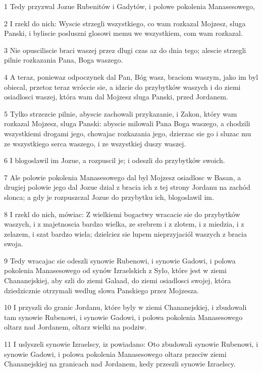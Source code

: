 \par 1 Tedy przyzwal Jozue Rubenitów i Gadytów, i polowe pokolenia Manasesowego,
\par 2 I rzekl do nich: Wyscie strzegli wszystkiego, co wam rozkazal Mojzesz, sluga Panski, i byliscie posluszni glosowi memu we wszystkiem, com wam rozkazal.
\par 3 Nie opusciliscie braci waszej przez dlugi czas az do dnia tego; alescie strzegli pilnie rozkazania Pana, Boga waszego.
\par 4 A teraz, poniewaz odpoczynek dal Pan, Bóg wasz, braciom waszym, jako im byl obiecal, przetoz teraz wróccie sie, a idzcie do przybytków waszych i do ziemi osiadlosci waszej, która wam dal Mojzesz sluga Panski, przed Jordanem.
\par 5 Tylko strzezcie pilnie, abyscie zachowali przykazanie, i Zakon, który wam rozkazal Mojzesz, sluga Panski: abyscie milowali Pana Boga waszego, a chodzili wszystkiemi drogami jego, chowajac rozkazania jego, dzierzac sie go i sluzac mu ze wszystkiego serca waszego, i ze wszystkiej duszy waszej.
\par 6 I blogoslawil im Jozue, a rozpuscil je; i odeszli do przybytków swoich.
\par 7 Ale polowie pokolenia Manasesowego dal byl Mojzesz osiadlosc w Basan, a drugiej polowie jego dal Jozue dzial z bracia ich z tej strony Jordanu na zachód slonca; a gdy je rozpuszczal Jozue do przybytku ich, blogoslawil im.
\par 8 I rzekl do nich, mówiac: Z wielkiemi bogactwy wracacie sie do przybytków waszych, i z majetnoscia bardzo wielka, ze srebrem i z zlotem, i z miedzia, i z zelazem, i szat bardzo wiela; dzielciez sie lupem nieprzyjaciól waszych z bracia swoja.
\par 9 Tedy wracajac sie odeszli synowie Rubenowi, i synowie Gadowi, i polowa pokolenia Manasesowego od synów Izraelskich z Sylo, które jest w ziemi Chananejskiej, aby szli do ziemi Galaad, do ziemi osiadlosci swojej, która dziedzicznie otrzymali wedlug slowa Panskiego przez Mojzesza.
\par 10 I przyszli do granic Jordanu, które byly w ziemi Chananejskiej, i zbudowali tam synowie Rubenowi, i synowie Gadowi, i polowa pokolenia Manasesowego oltarz nad Jordanem, oltarz wielki na podziw.
\par 11 I uslyszeli synowie Izraelscy, iz powiadano: Oto zbudowali synowie Rubenowi, i synowie Gadowi, i polowa pokolenia Manasesowego oltarz przeciw ziemi Chananejskiej na granicach nad Jordanem, kedy przeszli synowie Izraelscy.

